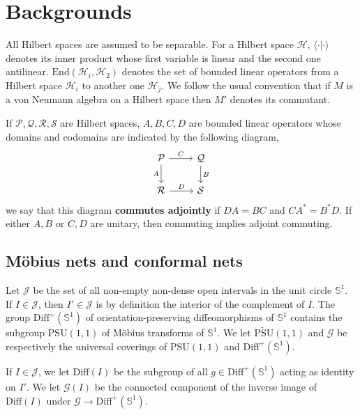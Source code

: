 \documentclass[11pt,b5paper,notitlepage]{article}
\theoremstyle{definition}
\theoremstyle{plain}
\newcommand{\mc}{\mathcal}
\newcommand{\End}{\mathrm{End}} %
\newcommand{\Diffp}{\mathrm{Diff}^+}
\newcommand{\Diff}{\mathrm{Diff}}
\newcommand{\PSU}{\mathrm{PSU}(1,1)}
\newcommand{\bk}[1]{\langle {#1}\rangle}
\newcommand{\scr}{\mathscr}
\newcommand{\mbb}{\mathbb}
\newcommand{\UPSU}{\widetilde{\mathrm{PSU}}(1,1)}
\newcommand{\Sbb}{{\mathbb S}}
\numberwithin{equation}{section}
\begin{document}
	
	
	



	
\section{Backgrounds}\label{lb18}


All Hilbert spaces are assumed to be separable.	For a Hilbert space $\mc H$, $\bk{\cdot|\cdot}$ denotes its inner product whose first variable is linear and the second one antilinear. $\End(\mc H_i,\mc H_2)$ denotes the set of bounded linear operators from a Hilbert space $\mc H_i$ to another one $\mc H_j$. We follow the usual convention that if $M$ is a von Neumann algebra on a Hilbert space then $M'$ denotes its commutant.

If $\mc P,\mc Q,\mc R,\mc S$ are Hilbert spaces, $A,B,C,D$ are bounded linear operators whose domains and codomains are indicated by the following diagram,
\begin{equation}
	\begin{tikzcd}
		\mc P \arrow[r, "C"] \arrow[d, "A"'] & \mc Q \arrow[d, "B"]\\
		\mc R\arrow[r, "D"] &\mc S
	\end{tikzcd}
\end{equation}
we say that this diagram \textbf{commutes adjointly} if $DA=BC$ and $CA^*=B^*D$. If either $A,B$ or $C,D$ are unitary, then commuting implies adjoint commuting.

\subsection*{M\"obius nets and conformal nets}


	
Let $\mc J$ be the set of all non-empty non-dense open intervals in the unit circle $\mbb S^1$. If $I\in\mc J$, then $I'\in\mc J$ is by definition the interior of the complement of $I$. The group $\Diffp(\mbb S^1)$ of orientation-preserving diffeomorphisms of $\mbb S^1$ contains the subgroup $\PSU$ of M\"obius transforms of $\mbb S^1$. We let $\UPSU$ and $\scr G$ be respectively the universal coverings of $\PSU$ and $\Diffp(\mbb S^1)$. 

If $I\in\mc J$, we let $\Diff(I)$ be the subgroup of all $g\in\Diffp(\mbb S^1)$ acting as identity on $I'$. We let $\scr G(I)$ be the connected component of the inverse image of $\Diff(I)$ under $\scr G\rightarrow\Diffp(\Sbb^1)$.
\end{document}
